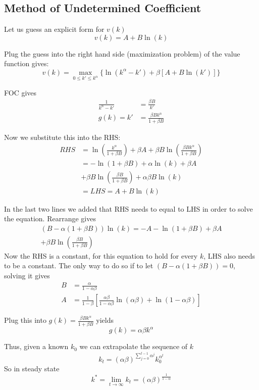 \documentclass[twocolumn, fleqn]{article}
\begin{document}
	\subsection{Method of Undetermined Coefficient}
	
	Let us guess an explicit form for $v(k)$
	\[ v(k) = A + B \ln(k)\]
	
	Plug the guess into the right hand side (maximization problem) of the value function gives:
	\[v(k) = \max_{0\leq k' \leq k^\alpha} \{ \ln (k^\alpha - k') + \beta [A + B \ln(k')]\}\]
	
	FOC gives
	\begin{align*}
		\frac{1}{k^\alpha - k'} &= \frac{\beta B}{k'}\\
		g(k) = k' &= \frac{\beta B k^\alpha}{1+\beta B}
	\end{align*}

	Now we substitute this into the RHS:
	\begin{align*}
		RHS &= \ln \left(\frac{k^\alpha}{1+\beta B}\right) + \beta A + \beta B \ln \left( \frac{\beta B k^\alpha}{1+\beta B}\right)\\
		&=-\ln\left(1 + \beta B\right)+ \alpha \ln\left(k\right)+ \beta A\\
		&+ \beta B \ln\left(\frac{\beta B}{1 + \beta B}\right)+ \alpha \beta B \ln\left(k\right)\\
		&= LHS = A + B \ln(k)
	\end{align*}

	In the last two lines we added that RHS needs to equal to LHS in order to solve the equation. Rearrange gives
	\begin{align*}
			(B - \alpha(1 + \beta B))\ln\left(k\right)
	= -A - \ln\left(1 + \beta B\right)
	+ \beta A\\
	+ \beta B \ln\left(\frac{\beta B}{1 + \beta B}\right)
	\end{align*}
	Now the RHS is a constant, for this equation to hold for every $k$, LHS also needs to be a constant. The only way to do so if to let $(B - \alpha(1 + \beta B))=0$, solving it gives
	\begin{align*}
		B &= \frac{\alpha}{1-\alpha\beta}\\
		A &= \frac{1}{1-\beta}\left[\frac{\alpha \beta}{1-\alpha \beta}\ln (\alpha \beta) + \ln(1-\alpha \beta)\right]
	\end{align*}

	Plug this into $g(k) = \frac{\beta B k^\alpha}{1+\beta B}$ yields
	\[g(k) = \alpha \beta k^\alpha\]
	
	Thus, given a known $k_0$ we can extrapolate the sequence of $k$
	\[k_t = (\alpha \beta)^{\sum_{j=0}^{t-1} \alpha^j}k_0^{\alpha^t}\]
	So in steady state
	\[k^\ast = \lim_{t\rightarrow \infty} k_t = (\alpha \beta)^{\frac{1}{1-\alpha}}\]
	
\end{document}
